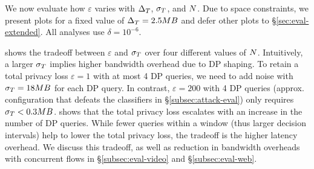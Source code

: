 We now  evaluate how $\varepsilon$ varies with $\Delta_T$,
$\sigma_T$, and $N$.
Due to space constraints, we present plots for a fixed value of $\Delta_T
= 2.5 MB$ and defer other plots to \S\ref{sec:eval-extended}.
All analyses use $\delta = 10^{-6}$.

 shows the tradeoff between
$\varepsilon$ and $\sigma_T$ over four different values of
$N$.
Intuitively, a larger
$\sigma_T$ implies higher bandwidth overhead due to DP shaping.
To retain a total privacy loss $\varepsilon = 1$ with at most 4 DP
queries, we need to add noise with $\sigma_T = 18 MB$ for each DP
query. In contrast, $\varepsilon = 200$ with 4 DP
queries (approx. configuration that defeats the classifiers
in \S\ref{subsec:attack-eval}) only requires $\sigma_T < 0.3 MB$.
%
 shows that the
total privacy loss escalates with an increase in the number of DP queries.
While fewer queries within a window (thus larger decision intervals) help to
lower the total privacy loss, the tradeoff is the higher latency overhead. We
discuss this tradeoff, as well as reduction in bandwidth overheads with
concurrent flows in \S\ref{subsec:eval-video} and \S\ref{subsec:eval-web}.

